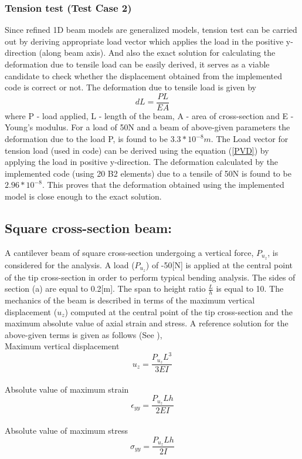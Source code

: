 \documentclass[a4paper,12pt]{article}
\begin{document}
\subsubsection*{Tension test (Test Case 2)}
\indent\indent\indent\indent Since refined 1D beam models are generalized models, tension test can be carried out by deriving appropriate load vector which applies the load in the positive y-direction (along beam axis). And also the exact solution for calculating the deformation due to tensile load can be easily derived, it serves as a viable candidate to check whether the displacement obtained from the implemented code is correct or not. The deformation due to tensile load is given by 
\begin{equation}
dL = \frac{P L}{E A}
\label{exactdef}
\end{equation}
where P - load applied, L - length of the beam, A - area of cross-section and E - Young's modulus. For a load of 50N and a beam of above-given parameters the deformation due to the load P, is found to be $3.3*10^{-8}m$. The Load vector for tension load (used in code) can be derived using the equation (\ref{PVD}) by applying the load in positive y-direction. The deformation calculated by the implemented code (using 20 B2 elements) due to a tensile of 50N is found to be $2.96*10^{-8}$. This proves that the deformation obtained using the implemented model is close enough to the exact solution.
\newpage
\subsection*{Square cross-section beam:}
\indent\indent\indent\indent A cantilever beam of square cross-section undergoing a vertical force, $P_{u_{z}}$, is considered for the analysis. A load ($P_{u_{z}}$) of -50[N] is applied at the central point of the tip cross-section in order to perform typical bending analysis. The sides of section (a) are equal to 0.2[m]. The span to height ratio $\frac{L}{h}$ is equal to 10. The mechanics of the beam is described in terms of the maximum vertical displacement ($u_{z}$) computed at the central point of the tip cross-section and the maximum absolute value of axial strain and stress. A reference solution for the above-given terms is given as follows (See \cite{carrera2010refined}),\\
Maximum vertical displacement 
\begin{equation}
u_{z} = \frac{P_{u_{z}} L^{3}}{3 E I}
\label{u_z}
\end{equation}
\\
Absolute value of maximum strain
\begin{equation}
\epsilon_{yy} = \frac{P_{u_{z}} L h}{2 E I}
\label{eyy}
\end{equation}
\\
Absolute value of maximum stress
\begin{equation}
\sigma_{yy} = \frac{P_{u_{z}} L h}{2 I}
\label{syy}
\end{equation}
\end{document}

